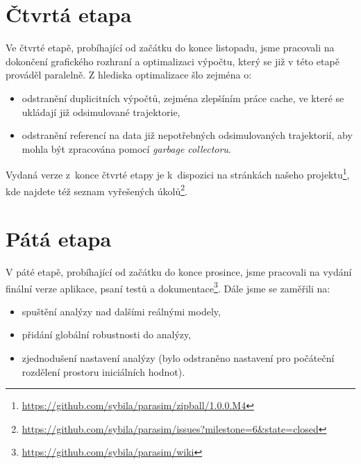\documentclass{parasim}
\begin{document}
\section{Čtvrtá etapa}

Ve čtvrté etapě, probíhající od začátku do konce listopadu, jsme pracovali na dokončení grafického rozhraní a
optimalizaci výpočtu, který se již v této etapě prováděl paralelně. Z hlediska optimalizace šlo zejména o:

\begin{itemize}
	\item	odstranění duplicitních výpočtů, zejména zlepšíním práce cache, ve které se ukládají již odsimulované trajektorie,
	\item	odstranění referencí na data již nepotřebných odsimulovaných trajektorií, aby mohla být zpracována pomocí \textit{garbage collectoru}.
\end{itemize}

Vydaná verze z~konce čtvrté etapy je k~dispozici na stránkách našeho projektu\footnote{\url{https://github.com/sybila/parasim/zipball/1.0.0.M4}},
kde najdete též seznam vyřešených úkolů\footnote{\url{https://github.com/sybila/parasim/issues?milestone=6&state=closed}}.

\section{Pátá etapa}

V páté etapě, probíhající od začátku do konce prosince, jsme pracovali na vydání finální verze aplikace, psaní testů a dokumentace\footnote{\url{https://github.com/sybila/parasim/wiki}}.
Dále jsme se zaměřili na: 

\begin{itemize}
	\item	spuštění analýzy nad dalšími reálnými modely,
	\item	přidání globální robustnosti do analýzy,
	\item	zjednodušení nastavení analýzy (bylo odstraněno nastavení pro počáteční rozdělení prostoru iniciálních hodnot).
\end{itemize}
\end{document}
